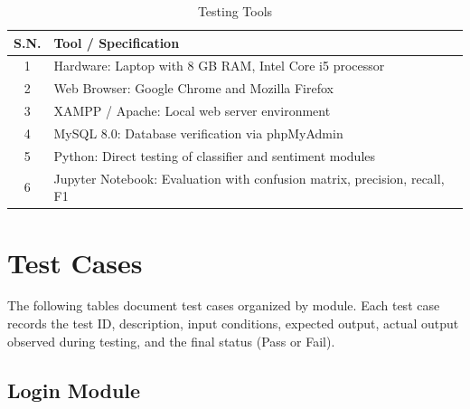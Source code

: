 \documentclass[12pt,a4paper]{report}
\begin{document}
\begin{table}[H]
\centering
\caption{Testing Tools}
\begin{tabular}{c p{10cm}}
\toprule
\textbf{S.N.} & \textbf{Tool / Specification} \\
\midrule
1 & Hardware: Laptop with 8 GB RAM, Intel Core i5 processor \\
2 & Web Browser: Google Chrome and Mozilla Firefox \\
3 & XAMPP / Apache: Local web server environment \\
4 & MySQL 8.0: Database verification via phpMyAdmin \\
5 & Python: Direct testing of classifier and sentiment modules \\
6 & Jupyter Notebook: Evaluation with confusion matrix, precision, recall, F1 \\
\bottomrule
\end{tabular}
\end{table}

\section{Test Cases}
The following tables document test cases organized by module. Each test case records the test ID, description, input conditions, expected output, actual output observed during testing, and the final status (Pass or Fail).

\subsection{Login Module}
\end{document}
